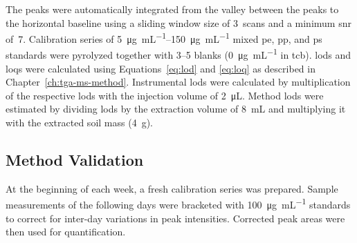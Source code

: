 The peaks were automatically integrated from the valley between the peaks to the horizontal baseline using a sliding window size of 3~scans and a minimum \ac{snr} of~7.
Calibration series of \SIrange{5}{150}{\micro\gram\per\milli\liter} mixed \ac{pe}, \ac{pp}, and \ac{ps} standards were pyrolyzed together with \numrange{3}{5} blanks (\SI{0}{\micro\gram\per\milli\liter} in \ac{tcb}).
\Acp{lod} and \acp{loq} were calculated using Equations~\ref{eq:lod} and \ref{eq:loq} as described in Chapter~\ref{ch:tga-ms-method}.
%
%
%
Instrumental \acp{lod} were calculated by multiplication of the respective \acp{lod} with the injection volume of \SI{2}{\micro\liter}. Method \acp{lod} were estimated by dividing \acp{lod} by the extraction volume of \SI{8}{\milli\liter} and multiplying it with the extracted soil mass (\SI{4}{\gram}).

\subsection{Method Validation}

At the beginning of each week, a fresh calibration series was prepared. Sample measurements of the following days were bracketed with \SI{100}{\micro\gram\per\milli\liter} standards to correct for inter-day variations in peak intensities. Corrected peak areas were then used for quantification.

